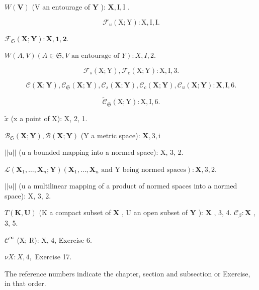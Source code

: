 \(W(\mathbf{V})\) (V an entourage of \(\mathbf{Y}\) ): \(\mathbf{X}, \mathrm{I}, \mathrm{I}\) .

\[
\mathcal {F} _ {u} (\mathrm{X}; \mathrm{Y}): \mathrm{X}, \mathrm{I}, \mathrm{I}.
\]

\(\mathcal{F}_{\mathfrak{S}}(\mathbf{X};\mathbf{Y}):\mathbf{X},\mathbf{1},\mathbf{2}.\)

\(W(A, V) (A \in \mathfrak{S}, V \text{ an entourage of } Y): X, I, 2.\)

\[
\mathcal {F} _ {s} (\mathrm{X}; \mathrm{Y}), \mathcal {F} _ {c} (\mathrm{X}; \mathrm{Y}): \mathrm{X}, \mathrm{I}, 3.
\]

\[
\mathcal {C} (\mathbf {X}; \mathbf {Y}), \mathcal {C} _ {\mathfrak {S}} (\mathbf {X}; \mathbf {Y}), \mathcal {C} _ {s} (\mathbf {X}; \mathbf {Y}), \mathcal {C} _ {c} (\mathbf {X}; \mathbf {Y}), \mathcal {C} _ {u} (\mathbf {X}; \mathbf {Y}): \mathbf {X}, \mathrm{I}, 6.
\]

\[
\tilde {\mathcal {C}} _ {\mathfrak {S}} (\mathrm{X}; \mathrm{Y}): \mathrm{X}, \mathrm{I}, 6.
\]

\(\tilde{x}\) (x a point of X): X, 2, 1.

\(\mathcal{B}_{\mathfrak{S}}(\mathbf{X};\mathbf{Y}),\mathcal{B}(\mathbf{X};\mathbf{Y})\) (Y a metric space): \(\mathbf{X},3,\mathrm{i}\)

\(||u||\) (u a bounded mapping into a normed space): X, 3, 2.

\(\mathscr{L}\left(\mathbf{X}_{1},\ldots,\mathbf{X}_{n};\mathbf{Y}\right)\left(\mathbf{X}_{1},\ldots,\mathbf{X}_{n}\text{ and Y being normed spaces}\right):\mathbf{X},3,2.\)

\(||u||\) (u a multilinear mapping of a product of normed spaces into a normed space): X, 3, 2.

\(T(\mathbf{K},\mathbf{U})\) (K a compact subset of \(\mathbf{X}\) , U an open subset of \(\mathbf{Y}\) ): \(\mathbf{X}\) , 3, 4. \(\mathcal{C}_{\beta}:\mathbf{X}\) , 3, 5.

\(\mathcal{C}^{\infty}\) (X; R): X, 4, Exercise 6.

\(\nu X:X,4,\) Exercise 17.

The reference numbers indicate the chapter, section and subsection or Exercise, in that order.

